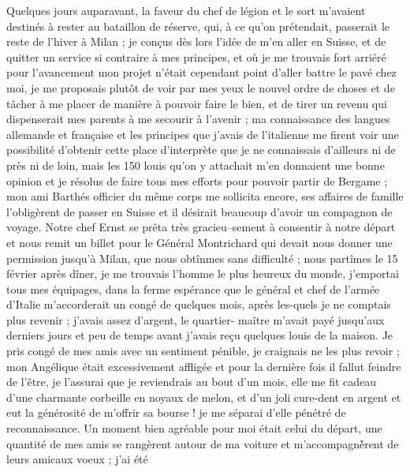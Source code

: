 \documentclass[12pt]{article}
\begin{document}
 Quelques jours auparavant, la faveur du chef de
légion et le sort m’avaient destinés à rester au bataillon de réserve, qui, à ce qu’on prétendait,
passerait le reste de l’hiver à Milan ; je conçus dès lors l’idée de m’en aller en Suisse, et de
quitter un service si contraire à mes principes, et où je me trouvais fort arriéré pour l’avancement
mon projet n’était cependant point d’aller battre le pavé chez moi, je me proposais plutôt de voir
par mes yeux le nouvel ordre de choses et de tâcher à me placer de manière à pouvoir faire le bien,
et de tirer un revenu qui dispenserait mes parents à me secourir à l’avenir ; ma connaissance des
langues allemande et française et les principes que j’avais de l’italienne me firent voir une
possibilité d’obtenir cette place d’interprète que je ne connaissais d’ailleurs ni de près ni de
loin, mais les 150 louis qu’on y attachait m’en donnaient une bonne opinion et je résolus de faire
tous mes efforts pour pouvoir partir de Bergame ; mon ami Barthés officier du même corps me
sollicita encore, ses affaires de famille l’obligèrent de passer en Suisse et il désirait beaucoup
d’avoir un compagnon de voyage. Notre chef Ernst se prêta très gracieu--sement à consentir à notre
départ et nous remit un billet pour le Général Montrichard qui devait nous donner une permission
jusqu’à Milan, que nous obtînmes sans difficulté ; nous partîmes le 15 février après dîner, je me
trouvais l’homme le plus heureux du monde, j’emportai tous mes équipages, dans la ferme espérance
que le général et chef de l’armée d’Italie m’accorderait un congé de quelques mois, après les-quels
je ne comptais plus revenir ; j’avais assez d’argent, le quartier- maître m’avait payé jusqu’aux
derniers jours et peu de temps avant j’avais reçu quelques louis de la maison. Je pris congé de mes
amis avec un sentiment pénible, je craignais ne les plus revoir ; mon Angélique était excessivement
affligée et pour la dernière fois il fallut feindre de l’être, je l’assurai que je reviendrais au
bout d’un mois, elle me fit cadeau d’une charmante corbeille en noyaux de melon, et d’un joli
cure-dent en argent et eut la générosité de m’offrir sa bourse ! je me séparai d’elle pénétré de
reconnaissance. Un moment bien agréable pour moi était celui du départ, une quantité de mes amis se
rangèrent autour de ma voiture et m’accompagnè́rent de leurs amicaux voeux ; j’ai été
\end{document}
